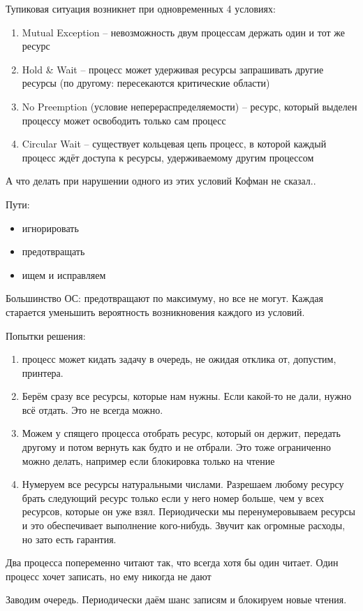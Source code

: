 \documentclass{book}
\theoremstyle{definition}
\begin{document}
\begin{theorem}
    [Кофман]

    Тупиковая ситуация возникнет при одновременных 4 условиях:
    \begin{enumerate}
        \item Mutual Exception -- невозможность двум процессам держать один и тот же ресурс
        \item Hold \& Wait -- процесс может удерживая ресурсы запрашивать другие ресурсы (по другому: пересекаются критические области)
        \item No Preemption (условие неперераспределяемости) -- ресурс, который выделен процессу может освободить только сам процесс
        \item Circular Wait -- существует кольцевая цепь процесс, в которой каждый процесс ждёт доступа к ресурсы, удерживаемому другим процессом
    \end{enumerate}

    А что делать при нарушении одного из этих условий Кофман не сказал..
\end{theorem}

Пути:
\begin{itemize}
    \item игнорировать
    \item предотвращать
    \item ищем и исправляем
\end{itemize}

Большинство ОС: предотвращают по максимуму, но все не могут. Каждая старается уменьшить вероятность возникновения каждого из условий.

Попытки решения:
\begin{enumerate}
    \item процесс может кидать задачу в очередь, не ожидая отклика от, допустим, принтера.
    \item Берём сразу все ресурсы, которые нам нужны. Если какой-то не дали, нужно всё отдать. Это не всегда можно.
    \item Можем у спящего процесса отобрать ресурс, который он держит, передать другому и потом вернуть как будто и не отбрали. Это тоже ограниченно можно делать, например если блокировка только на чтение
    \item Нумеруем все ресурсы натуральными числами. Разрешаем любому ресурсу брать следующий ресурс только если у него номер больше, чем у всех ресурсов, которые он уже взял. Периодически мы перенумеровываем ресурсы и это обеспечивает выполнение кого-нибудь. Звучит как огромные расходы, но зато есть гарантия.
\end{enumerate}

\begin{problem}

    Два процесса попеременно читают так, что всегда хотя бы один читает. Один процесс хочет записать, но ему никогда не дают

    Заводим очередь. Периодически даём шанс записям и блокируем новые чтения.
\end{problem}
\end{document}
